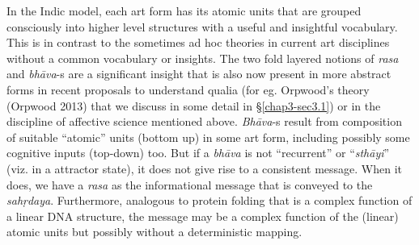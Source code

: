 In the Indic model, each art form has its atomic units that are grouped consciously into higher level structures with a useful and insightful vocabulary. This is in contrast to the sometimes ad hoc theories in current art disciplines without a common vocabulary or insights. The two fold layered notions of \textsl{rasa} and \textsl{bhāva}-s are a significant insight that is also now present in more abstract forms in recent proposals to understand qualia (for eg. Orpwood’s theory (Orpwood 2013) that we discuss in some detail in \S\ref{chap3-sec3.1}) or in the discipline of affective science mentioned above. \textsl{Bhāva}-s result from composition of suitable “atomic” units (bottom up) in some art form, including possibly some cognitive inputs (top-down) too. But if a \textsl{bhāva} is not “recurrent” or “\textsl{sthāyi}” (viz. in a attractor state), it does not give rise to a consistent message. When it does, we have a \textsl{rasa} as the informational message that is conveyed to the \textsl{sahṛdaya}. Furthermore, analogous to protein folding that is a complex function of a linear DNA structure, the message may be a complex function of the (linear) atomic units but possibly without a deterministic mapping.


